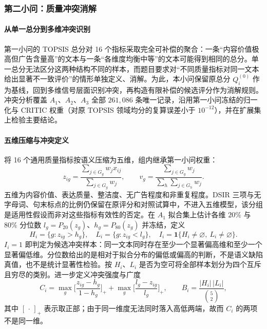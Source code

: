 \subsubsection{第二小问：质量冲突消解}
\label{sec:q1-conflict}

\paragraph{从单一总分到多维冲突识别}
第一小问的 TOPSIS 总分对 16 个指标采取完全可补偿的聚合：一条“内容价值极高但广告含量高”的文本与一条“各维度均衡中等”的文本可能得到相同的总分。单一总分无法区分这两种结构不同的样本，而题目要求对“不同质量指标对同一文本给出显著不一致评价”的情形单独定义、消解。为此，本小问保留原总分 $Q_i^{(0)}$ 作为基线，回到多维信号层面识别冲突，再构造有限补偿的候选评分作为消解规则。冲突分析覆盖 $A_1$、$A_2$、$A_3$ 全部 $261{,}086$ 条唯一记录，沿用第一小问冻结的归一化与 CRITIC 权重（对原 TOPSIS 领域均分的复算误差小于 $10^{-12}$），并在扩展集上检验主要结论。

\paragraph{五维压缩与冲突定义}
将 16 个通用质量指标按语义压缩为五维，组内继承第一小问权重：
\begin{equation}
z_{ig}=\frac{\sum_{j\in G_g}w_jx_{ij}}{\sum_{j\in G_g}w_j},\qquad
v_g=\frac{\sum_{j\in G_g}w_j}{\sum_h\sum_{j\in G_h}w_j}.
\label{eq:q12-group}
\end{equation}
五维为内容价值、表达质量、整洁度、无广告程度和非重复程度。DSIR 三项与无字母词、句末标点的比例仍保留在原评分和对照试算中，不进入五维模型，该分组是适用性假设而非对这些指标有效性的否定。在 $A_1$ 拟合集上估计各维 $20\%$ 与 $80\%$ 分位数 $l_g=P_{20}(z_g)$、$h_g=P_{80}(z_g)$ 并冻结，定义
\begin{equation}
H_i=\{g:z_{ig}>h_g\},\quad L_i=\{g:z_{ig}<l_g\},\quad
I_i=\mathbf{1}\{H_i\neq\varnothing,\ L_i\neq\varnothing\}.
\label{eq:q12-conflict}
\end{equation}
$I_i=1$ 即判定为候选冲突样本：同一文本同时存在至少一个显著偏高维和至少一个显著偏低维。分位数给出的是相对于拟合分布的偏低或偏高的判断，不是语义缺陷真值，也不是统计显著性检验。按 $H_i$、$L_i$ 是否为空可将全部样本划分为四个互斥且穷尽的类别。进一步定义冲突强度与广度
\begin{equation}
C_i=\max_g\Big[\frac{z_{ig}-h_g}{1-h_g}\Big]_+ + \max_g\Big[\frac{l_g-z_{ig}}{l_g}\Big]_+,
\qquad
B_i=\frac{|H_i|\,|L_i|}{\binom{5}{2}},
\label{eq:q12-strength}
\end{equation}
其中 $[\,\cdot\,]_+$ 表示取正部；由于同一维度无法同时落入高低两端，故而 $C_i$ 的两项不是同一维。

